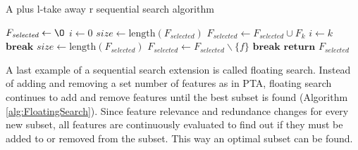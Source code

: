 \documentclass[10pt,a4paper]{article}
\begin{document}
\begin{itemize}
		\begin{algorithm}[H]
			\caption{A plus l-take away r sequential search algorithm\cite{Reunanen2006}}\label{alg:PTA}
			\begin{algorithmic}[1]
				\State $F_{\textit{selected}} \gets \O$			
				\State $i \gets 0$								
									
				\State $\textit{size} \gets \text{length}(F_{\textit{selected}})$ 
					
					
				\State $F_{\textit{selected}} \gets F_{\textit{selected}} \cup F_k$ 
				\EndIf
				\State $i \gets k$						
				 	
				\State $\textbf{break}$
				\EndIf
				\EndFor
				\State $\textit{size} \gets \text{length}(F_{\textit{selected}})$ 
					
					
				\State $F_{\textit{selected}} \gets F_{\textit{selected}} \backslash \{f\}$ 
				\EndIf
				 	
				\State $\textbf{break}$
				\EndIf
				\EndFor
				\EndWhile
				\State $\textbf{return } F_{\textit{selected}}$
				\EndProcedure
			\end{algorithmic}
		\end{algorithm}
		
		A last example of a sequential search extension is called floating search. Instead of adding and removing a set number of features as in PTA, floating search continues to add and remove features until the best subset is found (Algorithm \ref{alg:FloatingSearch}). Since feature relevance and redundance changes for every new subset, all features are continuously evaluated to find out if they must be added to or removed from the subset. This way an optimal subset can be found\cite{Reunanen2006}.
		

\end{itemize}
\end{document}
